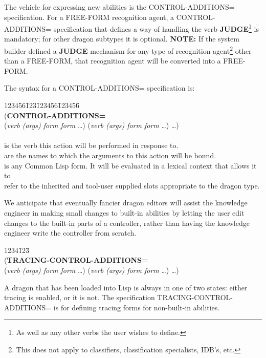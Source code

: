 The vehicle for expressing new abilities is the CONTROL-ADDITIONS=
specification.  For a FREE-FORM recognition agent, a
CONTROL-ADDITIONS= specification that defines a way of handling the
verb {\bf JUDGE}\footnote{As well as any other verbs the user wishes
to define.} is mandatory; for other dragon subtypes it is optional.
{\bf NOTE:} If the system builder defined a {\bf JUDGE} mechanism for
any type of recognition agent\footnote{This does not apply to
classifiers, classification specialists, IDB's, etc.} other than a
FREE-FORM, that recognition agent will be converted into a FREE-FORM.

The syntax for a CONTROL-ADDITIONS= specification is:

\begin{tabbing}
123456\=123\=123456\=123456\= \kill
\\
({\bf CONTROL-ADDITIONS=} \\
\>\>({\it verb (args) form form\/} \ldots)
({\it verb (args) form form\/} \ldots) \ldots) \\
\\
\>\> is the verb this action will be performed in
response to.\\
\>\> are the names to which the arguments to this action
will be bound.\\
\>\> is any Common Lisp form.  It will be evaluated in a
lexical context that allows it to\\
\>\>\>\>refer to the inherited and tool-user supplied slots appropriate to the dragon type.
\\
\end{tabbing}
We anticipate that eventually fancier dragon editors will assist the
knowledge engineer in making small changes to built-in abilities by
letting the user edit changes to the built-in parts of a controller,
rather than having the knowledge engineer write the controller from
scratch.

\begin{tabbing}
1234\=123\= \kill
\\
({\bf TRACING-CONTROL-ADDITIONS=} \\
\>\>({\it verb (args) form form\/} \ldots)
({\it verb (args) form form\/} \ldots) \ldots)
\end{tabbing}
A dragon that has been loaded into Lisp is always in one of two
states: either tracing is enabled, or it is not.  The specification
TRACING-CONTROL-ADDITIONS= is for defining tracing forms for
non-built-in abilities.

